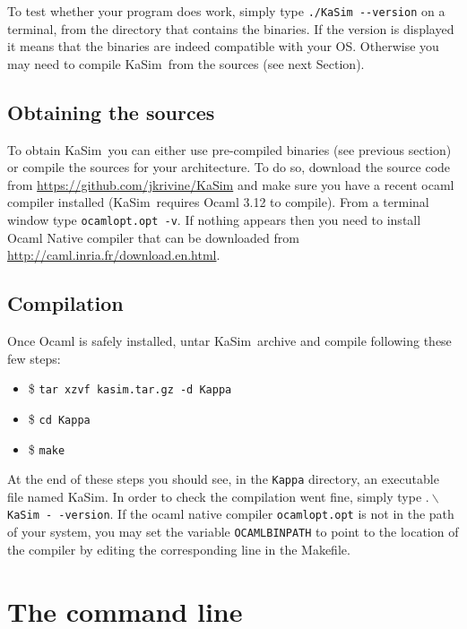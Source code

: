 \documentclass[11pt]{book}
\def\KaSim{\textsf{KaSim}}
\def\ttt#1{\texttt{#1}}
\def\bs{\backslash}
\def\ITE#1{\begin{itemize}#1\end{itemize}}
\def\dd{-\hspace{0.001cm}-}
\begin{document}
To test whether your program does work, simply type \ttt{./KaSim \dd version} on a terminal, from the directory that contains the binaries. If the version is displayed it means that the binaries are indeed compatible with your OS. Otherwise you may need to compile \KaSim~from the sources (see next Section).

\section{Obtaining the sources}
To obtain \KaSim~you can either use pre-compiled binaries (see previous section) or compile the sources for your architecture. To do so, download the source code from \url{https://github.com/jkrivine/KaSim} and make sure you have a recent ocaml compiler installed (\KaSim~requires Ocaml 3.12 to compile). From a terminal window type \ttt{ocamlopt.opt -v}. If nothing appears then you need to install Ocaml Native compiler that can be downloaded from \url{http://caml.inria.fr/download.en.html}. 

\section{Compilation}
Once Ocaml is safely installed, untar \KaSim~archive and compile following these few steps:
\ITE{
\item[\$]\ttt{tar xzvf kasim.tar.gz -d Kappa}
\item[\$]\ttt{cd Kappa}
\item[\$]\ttt{make}
}
At the end of these steps you should see, in the \ttt{Kappa} directory, an executable file named KaSim.  In order to check the compilation went fine, simply type $.\bs$\ttt{KaSim -\,-version}. If the ocaml native compiler \ttt{ocamlopt.opt} is not in the path of your system, you may set the variable \ttt{OCAMLBINPATH} to point to the location of the compiler by editing the corresponding line in the Makefile.

\chapter{The command line}\label{chap:cl}
\end{document}
